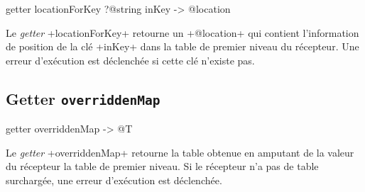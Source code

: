 
\begin{galgas}
getter locationForKey ?@string inKey -> @location
\end{galgas}


Le \emph{getter} \ggs+locationForKey+ retourne un \ggs+@location+ qui contient l'information de position de la clé \ggs+inKey+ dans la table de premier niveau du récepteur. Une erreur d'exécution est déclenchée si cette clé n'existe pas.








\subsection{Getter \texttt{overriddenMap}}

\begin{galgas}
getter overriddenMap -> @T
\end{galgas}


Le \emph{getter} \ggs+overriddenMap+ retourne la table obtenue en amputant de la valeur du récepteur la table de premier niveau. Si le récepteur n'a pas de table surchargée, une erreur d'exécution est déclenchée.









